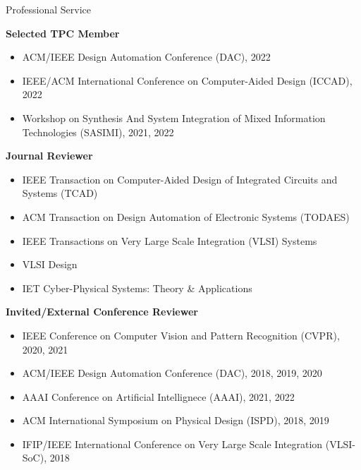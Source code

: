 
\begin{rSection}{Professional Service}

\textbf{Selected TPC Member}
\begin{itemize}
    \item ACM/IEEE Design Automation Conference (DAC), 2022
    \item IEEE/ACM International Conference on Computer-Aided Design (ICCAD), 2022
    \item Workshop on Synthesis And System Integration of Mixed Information Technologies (SASIMI), 2021, 2022
\end{itemize}


\textbf{Journal Reviewer}
\begin{itemize}
    \item IEEE Transaction on Computer-Aided Design of Integrated Circuits and Systems (TCAD)
    \item ACM Transaction on Design Automation of Electronic Systems (TODAES)
    \item IEEE Transactions on Very Large Scale Integration (VLSI) Systems
    \item VLSI Design
    \item IET Cyber-Physical Systems: Theory \& Applications
\end{itemize}

\textbf{Invited/External Conference Reviewer}
\begin{itemize}
    \item IEEE Conference on Computer Vision and Pattern Recognition (CVPR), 2020, 2021
    \item ACM/IEEE Design Automation Conference (DAC), 2018, 2019, 2020
    \item AAAI Conference on Artificial Intellignece (AAAI), 2021, 2022
    \item ACM International Symposium on Physical Design (ISPD), 2018, 2019
    \item IFIP/IEEE International Conference on Very Large Scale Integration (VLSI-SoC), 2018
\end{itemize}
\end{rSection}


